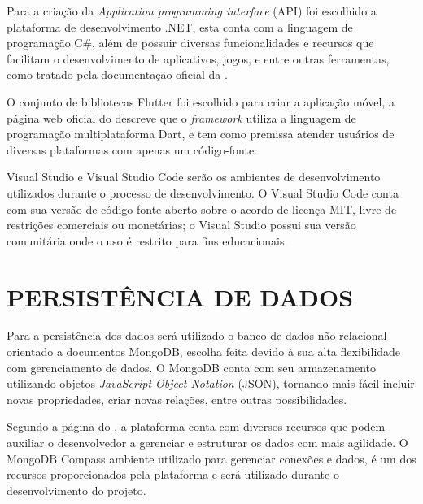 Para a criação da \textit{Application programming interface} (API) foi escolhido a plataforma de desenvolvimento .NET, esta conta com a linguagem de programação C\#, além de possuir diversas funcionalidades e recursos que facilitam o desenvolvimento de aplicativos, jogos, e entre outras ferramentas, como tratado pela documentação oficial da \textcite{Microsoft24}.

O conjunto de bibliotecas Flutter foi escolhido para criar a aplicação móvel, a página web oficial do \textcite{FlutterWeb24} descreve que o \textit{framework} utiliza a linguagem de programação multiplataforma Dart, e tem como premissa atender usuários de diversas plataformas com apenas um código-fonte.

Visual Studio e Visual Studio Code serão os ambientes de desenvolvimento  utilizados durante o processo de desenvolvimento. O Visual Studio Code conta com sua versão de código fonte aberto sobre o acordo de licença MIT, livre de restrições comerciais ou monetárias; o Visual Studio possui sua versão comunitária onde o uso é restrito para fins educacionais.

\section{PERSISTÊNCIA DE DADOS}
\label{sec:persistenciaDeDados}

Para a persistência dos dados será utilizado o banco de dados não relacional orientado a documentos MongoDB, escolha feita devido à sua alta flexibilidade com gerenciamento de dados. O MongoDB conta com seu armazenamento utilizando objetos \textit{JavaScript Object Notation} (JSON), tornando mais fácil incluir novas propriedades, criar novas relações, entre outras possibilidades. 

Segundo a página do \textcite{MongoDB24}, a plataforma conta com diversos recursos que podem auxiliar o desenvolvedor a gerenciar e estruturar os dados com mais agilidade. O MongoDB Compass ambiente utilizado para gerenciar conexões e dados, é um dos recursos proporcionados pela plataforma e será utilizado durante o desenvolvimento do projeto.

